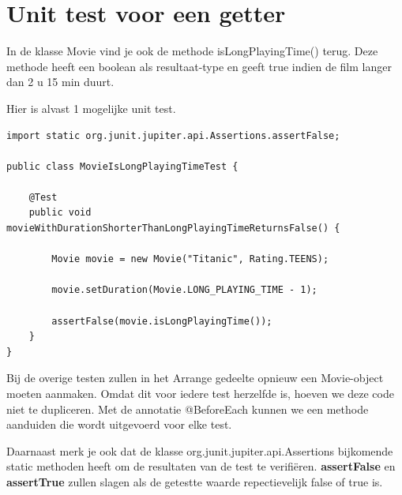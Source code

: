 \documentclass{tstextbook}
\begin{document}
\clearpage

\section{Unit test voor een getter}

In de klasse Movie vind je ook de methode isLongPlayingTime() terug. Deze methode heeft een boolean als resultaat-type en geeft true indien de film langer dan 2 u 15 min duurt.

Hier is alvast 1 mogelijke unit test.

\begin{lstlisting}
import static org.junit.jupiter.api.Assertions.assertFalse;

public class MovieIsLongPlayingTimeTest {
	
	@Test
	public void movieWithDurationShorterThanLongPlayingTimeReturnsFalse() {
		
		Movie movie = new Movie("Titanic", Rating.TEENS);
		
		movie.setDuration(Movie.LONG_PLAYING_TIME - 1);
		
		assertFalse(movie.isLongPlayingTime());
	}
}
\end{lstlisting}

Bij de overige testen zullen in het Arrange gedeelte opnieuw een Movie-object moeten aanmaken. Omdat dit voor iedere test herzelfde is, hoeven we deze code niet te dupliceren. 
Met de annotatie @BeforeEach kunnen we een methode aanduiden die wordt uitgevoerd voor elke test.

Daarnaast merk je ook dat de klasse org.junit.jupiter.api.Assertions bijkomende static methoden heeft om de resultaten van de test te verifi\"eren. \textbf{assertFalse} en \textbf{assertTrue} zullen  slagen als de getestte waarde repectievelijk false of true is.
\end{document}
